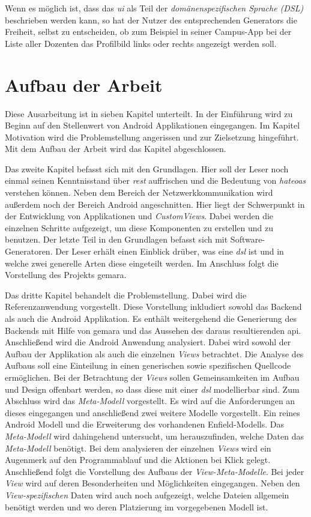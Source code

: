 Wenn es möglich ist, dass das \textit{\ac{ui}} als Teil der \textit{domänenspezifischen Sprache (DSL)} beschrieben werden kann, so hat der Nutzer des entsprechenden Generators die Freiheit, selbst zu entscheiden, ob zum Beispiel in seiner Campus-App bei der Liste aller Dozenten das Profilbild links oder rechts angezeigt werden soll.

\section{Aufbau der Arbeit}\label{sec:structure}
Diese Ausarbeitung ist in sieben Kapitel unterteilt. In der Einführung wird zu Beginn auf den Stellenwert von Android Applikationen eingegangen. Im Kapitel Motivation wird die Problemstellung angerissen und zur Zielsetzung hingeführt. Mit dem Aufbau der Arbeit wird das Kapitel abgeschlossen.

Das zweite Kapitel befasst sich mit den Grundlagen. Hier soll der Leser noch einmal seinen Kenntnisstand über \textit{\acf{rest}} auffrischen und die Bedeutung von \textit{\acf{hateoas}} verstehen können. Neben dem Bereich der Netzwerkkommunikation wird außerdem noch der Bereich Android angeschnitten. Hier liegt der Schwerpunkt in der Entwicklung von Applikationen und \textit{CustomViews}. Dabei werden die einzelnen Schritte aufgezeigt, um diese Komponenten zu erstellen und zu benutzen. Der letzte Teil in den Grundlagen befasst sich mit Software-Generatoren. Der Leser erhält einen Einblick drüber, was eine \textit{\acf{dsl}} ist und in welche zwei generelle Arten diese eingeteilt werden. Im Anschluss folgt die Vorstellung des Projekts \acf{gemara}. 

Das dritte Kapitel behandelt die Problemstellung. Dabei wird die Referenzanwendung vorgestellt. Diese Vorstellung inkludiert sowohl das Backend als auch die Android Applikation. Es enthält weitergehend die Generierung des Backends mit Hilfe von \ac{gemara} und das Aussehen des daraus resultierenden \ac{api}. 
Anschließend wird die Android Anwendung analysiert. Dabei wird sowohl der Aufbau der Applikation als auch die einzelnen \textit{Views} betrachtet. Die Analyse des Aufbaus soll eine Einteilung in einen generischen sowie spezifischen Quellcode ermöglichen. Bei der Betrachtung der \textit{Views} sollen Gemeinsamkeiten im Aufbau und Design offenbart werden, so dass diese mit einer \textit{\ac{dsl}} modellierbar sind. Zum Abschluss wird das \textit{Meta-Modell} vorgestellt. Es wird auf die Anforderungen an dieses eingegangen und anschließend zwei weitere Modelle vorgestellt. Ein reines Android Modell und die Erweiterung des vorhandenen Enfield-Modells. Das \textit{Meta-Modell} wird dahingehend untersucht, um herauszufinden, welche Daten das \textit{Meta-Modell} benötigt. Bei dem analysieren der einzelnen \textit{Views} wird ein Augenmerk auf den Programmablauf und die Aktionen bei Klick gelegt. Anschließend folgt die Vorstellung des Aufbaus der \textit{View-Meta-Modelle}. Bei jeder \textit{View} wird auf deren Besonderheiten und Möglichkeiten eingegangen. Neben den \textit{View-spezifischen} Daten wird auch noch aufgezeigt, welche Dateien allgemein benötigt werden und wo deren Platzierung im vorgegebenen Modell ist.

